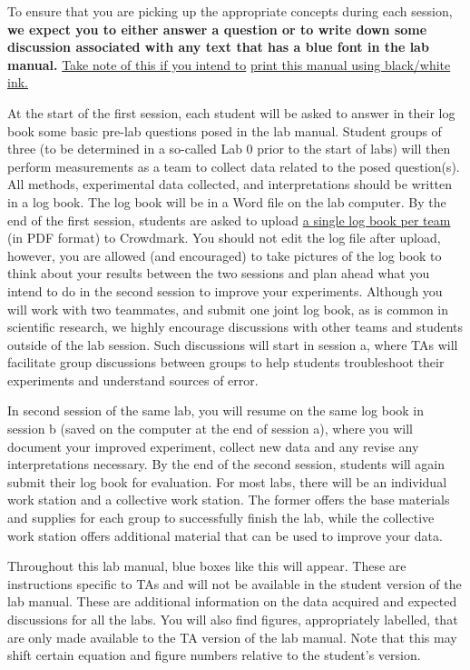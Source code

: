 \documentclass[12pt]{report}
\begin{document}
To ensure that you are picking up the appropriate concepts during each session, 
\textbf{ {\color{blue} we expect you to either answer a question or to write down some discussion associated with any text that has a blue font in the lab manual.}} \underline{Take note of this if you intend to} \underline{print this manual using black/white ink.}

At the start of the first session, each student will be asked to answer in their log book some basic pre-lab questions posed in the lab manual. Student groups of three (to be determined in a so-called Lab 0 prior to the start of labs) will then perform measurements as a team to collect data related to the posed question(s). 
All methods, experimental data collected, and interpretations should be written in a log book. 
The log book will be in a Word file on the lab computer. By the end of the first session, students are asked to upload \underline{a single log book per team} (in PDF format) to Crowdmark. You should not edit the log file after upload, however, you are allowed (and encouraged) to take pictures of the log book to think about your results between the two sessions and plan ahead what you intend to do in the second session to improve your experiments. 
Although you will work with two teammates, and submit one joint log book, as is common in scientific research, we highly encourage discussions with other teams and students outside of the lab session. Such discussions will start in session a, where TAs will facilitate group discussions between groups to help students troubleshoot their experiments and understand sources of error. 

In second session of the same lab, you will resume on the same log book in session b (saved on the computer at the end of session a), where you will document your improved experiment, collect new data and any revise any interpretations necessary. 
By the end of the second session, students will again submit their log book for evaluation. For most labs, there will be an individual work station and a collective work station. The former offers the base materials and supplies for each group to successfully finish the lab, while the collective work station offers additional material that can be used to improve your data.

\begin{tcolorbox}[title=Comments for TAs]
Throughout this lab manual, blue boxes like this will appear. These are instructions specific to TAs and will not be available in the student version of the lab manual.
These are additional information on the data acquired and expected discussions for all the labs.
You will also find figures, appropriately labelled, that are only made available to the TA version of the lab manual.
Note that this may shift certain equation and figure numbers relative to the student's version.
\end{tcolorbox}
\end{document}
